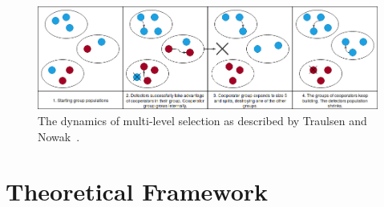 \documentclass[]{final_report}
\begin{document}
\begin{figure}
	\center
	\includegraphics[width=\textwidth]{GroupSelection.png}
	\caption{The dynamics of multi-level selection as described by Traulsen and Nowak~\cite{multilevel_nowak}.}
	\label{fig:group}
\end{figure}

\section{Theoretical Framework}
\end{document}
